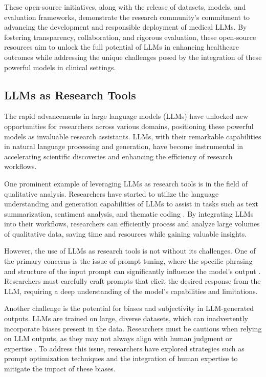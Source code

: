 \documentclass[11pt]{article}
\begin{document}
These open-source initiatives, along with the release of datasets, models, and evaluation frameworks, demonstrate the research community's commitment to advancing the development and responsible deployment of medical LLMs. By fostering transparency, collaboration, and rigorous evaluation, these open-source resources aim to unlock the full potential of LLMs in enhancing healthcare outcomes while addressing the unique challenges posed by the integration of these powerful models in clinical settings.

\subsection{LLMs as Research Tools}

The rapid advancements in large language models (LLMs) have unlocked new opportunities for researchers across various domains, positioning these powerful models as invaluable research assistants. LLMs, with their remarkable capabilities in natural language processing and generation, have become instrumental in accelerating scientific discoveries and enhancing the efficiency of research workflows.

One prominent example of leveraging LLMs as research tools is in the field of qualitative analysis. Researchers have started to utilize the language understanding and generation capabilities of LLMs to assist in tasks such as text summarization, sentiment analysis, and thematic coding \cite{ref6}. By integrating LLMs into their workflows, researchers can efficiently process and analyze large volumes of qualitative data, saving time and resources while gaining valuable insights.

However, the use of LLMs as research tools is not without its challenges. One of the primary concerns is the issue of prompt tuning, where the specific phrasing and structure of the input prompt can significantly influence the model's output \cite{ref6}. Researchers must carefully craft prompts that elicit the desired response from the LLM, requiring a deep understanding of the model's capabilities and limitations.

Another challenge is the potential for biases and subjectivity in LLM-generated outputs. LLMs are trained on large, diverse datasets, which can inadvertently incorporate biases present in the data. Researchers must be cautious when relying on LLM outputs, as they may not always align with human judgment or expertise \cite{ref6}. To address this issue, researchers have explored strategies such as prompt optimization techniques and the integration of human expertise to mitigate the impact of these biases.
\end{document}
